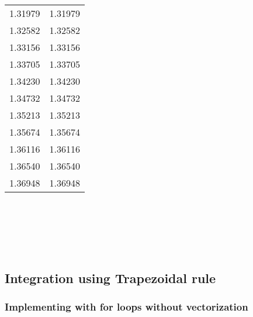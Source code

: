 \documentclass[a4paper]{report}
\begin{document}
\begin{table}[H]
\begin{tabular}{|c|c|}
 1.31979 & 1.31979 \\
 1.32582 & 1.32582 \\
 1.33156 & 1.33156 \\
 1.33705 & 1.33705 \\
 1.34230 & 1.34230 \\
 1.34732 & 1.34732 \\
 1.35213 & 1.35213 \\
 1.35674 & 1.35674 \\
 1.36116 & 1.36116 \\
 1.36540 & 1.36540 \\
 1.36948 & 1.36948 \\
    \hline
    \end{tabular}
    \end{table}

    \begin{center}
    \end{center}
    { \hspace*{\fill} \\}
    
    \begin{center}
    \end{center}
    { \hspace*{\fill} \\}
    
    \begin{center}
    \end{center}
    { \hspace*{\fill} \\}
    
     \subsection{Integration using Trapezoidal rule}
        \subsubsection{Implementing with for loops without vectorization}
        
\end{document}
